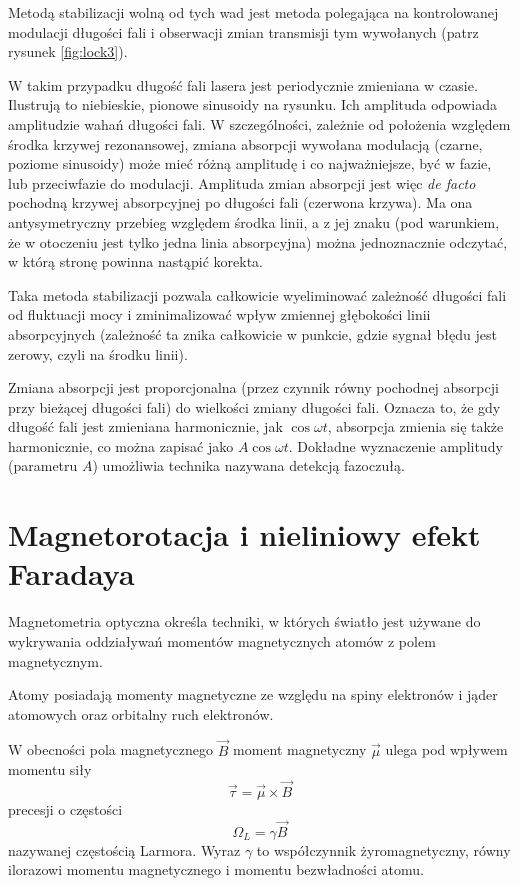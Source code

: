 \documentclass[a4paper,10pt,twoside]{report}
\begin{document}
Metodą stabilizacji wolną od tych wad jest metoda  polegająca na kontrolowanej modulacji długości fali i obserwacji zmian transmisji tym wywołanych (patrz rysunek \ref{fig:lock3}).

 W takim przypadku długość fali lasera jest periodycznie zmieniana w czasie. Ilustrują to niebieskie, pionowe sinusoidy na rysunku. Ich amplituda odpowiada amplitudzie wahań długości fali.
W szczególności, zależnie od położenia względem środka krzywej rezonansowej, zmiana absorpcji wywołana modulacją (czarne, poziome sinusoidy) może mieć
 różną amplitudę i co najważniejsze, być w fazie, lub przeciwfazie do modulacji.
  Amplituda zmian absorpcji jest więc \textit{de facto} pochodną krzywej absorpcyjnej po długości fali (czerwona krzywa). 
  Ma ona antysymetryczny przebieg względem środka linii, a z jej znaku (pod warunkiem, że w otoczeniu jest tylko jedna linia absorpcyjna)
 można jednoznacznie odczytać, w którą stronę powinna nastąpić korekta.
 
 Taka metoda stabilizacji pozwala całkowicie wyeliminować zależność długości fali od fluktuacji mocy  i zminimalizować wpływ zmiennej głębokości linii absorpcyjnych (zależność ta znika całkowicie w punkcie, gdzie sygnał błędu jest zerowy, czyli na środku linii).

Zmiana absorpcji jest proporcjonalna (przez czynnik równy pochodnej absorpcji przy bieżącej długości fali) do wielkości zmiany długości fali. Oznacza to, że gdy długość fali jest zmieniana harmonicznie, jak $\cos \omega t$, absorpcja zmienia się także harmonicznie, co można zapisać jako $A \cos \omega t$. Dokładne wyznaczenie amplitudy (parametru $A$)
umożliwia technika nazywana detekcją fazoczułą.
\label{olockinie}


\pagebreak

\section{Magnetorotacja i nieliniowy efekt Faradaya}

Magnetometria optyczna określa techniki, w których światło jest używane  do wykrywania oddziaływań momentów magnetycznych atomów z polem magnetycznym.

Atomy posiadają momenty magnetyczne ze względu na spiny elektronów i jąder atomowych oraz orbitalny ruch elektronów.

W obecności pola magnetycznego $\vec B$ moment magnetyczny $\vec \mu$ ulega pod wpływem momentu siły
\begin{equation}
\vec \tau =\vec \mu \times \vec B
\end{equation}
precesji o częstości
\begin{equation}
\Omega_L =\gamma \vec B
\end{equation}
nazywanej częstością Larmora. Wyraz $\gamma$ to współczynnik żyromagnetyczny, równy ilorazowi momentu magnetycznego i momentu bezwładności atomu.
\end{document}
